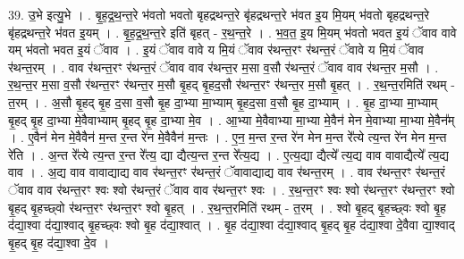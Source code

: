 \documentclass[17pt]{extarticle}
\begin{document}
39. उ॒भे इत्यु॒भे । . बृ॒ह॒द्र॒थ॒न्त॒रे भ॑वतो भवतो बृहद्रथन्त॒रे बृ॑हद्रथन्त॒रे भ॑वत इ॒य मि॒यम् भ॑वतो बृहद्रथन्त॒रे बृ॑हद्रथन्त॒रे भ॑वत इ॒यम् । . बृ॒ह॒द्र॒थ॒न्त॒रे इति॑ बृहत् - र॒थ॒न्त॒रे । . भ॒व॒त॒ इ॒य मि॒यम् भ॑वतो भवत इ॒यं ॅवाव वावे यम् भ॑वतो भवत इ॒यं ॅवाव । . इ॒यं ॅवाव वावे य मि॒यं ॅवाव र॑थन्त॒रꣳ र॑थन्त॒रं ॅवावे य मि॒यं ॅवाव र॑थन्त॒रम् । . वाव र॑थन्त॒रꣳ र॑थन्त॒रं ॅवाव वाव र॑थन्त॒र म॒सा व॒सौ र॑थन्त॒रं ॅवाव वाव र॑थन्त॒र म॒सौ । . र॒थ॒न्त॒र म॒सा व॒सौ र॑थन्त॒रꣳ र॑थन्त॒र म॒सौ बृ॒हद् बृ॒हद॒सौ र॑थन्त॒रꣳ र॑थन्त॒र म॒सौ बृ॒हत् । . र॒थ॒न्त॒रमिति॑ रथम् - त॒रम् । . अ॒सौ बृ॒हद् बृ॒ह द॒सा व॒सौ बृ॒ह दा॒भ्या मा॒भ्याम् बृ॒हद॒सा व॒सौ बृ॒ह दा॒भ्याम् । . बृ॒ह दा॒भ्या मा॒भ्याम् बृ॒हद् बृ॒ह दा॒भ्या मे॒वैवाभ्याम् बृ॒हद् बृ॒ह दा॒भ्या मे॒व । . आ॒भ्या मे॒वैवाभ्या मा॒भ्या मे॒वैन॑ मेन मे॒वाभ्या मा॒भ्या मे॒वैन᳚म् । . ए॒वैन॑ मेन मे॒वैवैन॑ म॒न्त र॒न्त रे॑न मे॒वैवैन॑ म॒न्तः । . ए॒न॒ म॒न्त र॒न्त रे॑न मेन म॒न्त रे᳚त्ये त्य॒न्त रे॑न मेन म॒न्त रे॑ति । . अ॒न्त रे᳚त्ये त्य॒न्त र॒न्त रे᳚त्य॒ द्या द्यैत्य॒न्त र॒न्त रे᳚त्य॒द्य । . ए॒त्य॒द्या द्यैत्ये᳚ त्य॒द्य वाव वावाद्यैत्ये᳚ त्य॒द्य वाव । . अ॒द्य वाव वावाद्याद्य वाव र॑थन्त॒रꣳ र॑थन्त॒रं ॅवावाद्याद्य वाव र॑थन्त॒रम् । . वाव र॑थन्त॒रꣳ र॑थन्त॒रं ॅवाव वाव र॑थन्त॒रꣳ श्वः श्वो र॑थन्त॒रं ॅवाव वाव र॑थन्त॒रꣳ श्वः । . र॒थ॒न्त॒रꣳ श्वः श्वो र॑थन्त॒रꣳ र॑थन्त॒रꣳ श्वो बृ॒हद् बृ॒हच्छ्वो र॑थन्त॒रꣳ र॑थन्त॒रꣳ श्वो बृ॒हत् । . र॒थ॒न्त॒रमिति॑ रथम् - त॒रम् । . श्वो बृ॒हद् बृ॒हच्छ्वः श्वो बृ॒ह द॑द्या॒श्वा द॑द्या॒श्वाद् बृ॒हच्छ्वः श्वो बृ॒ह द॑द्या॒श्वात् । . बृ॒ह द॑द्या॒श्वा द॑द्या॒श्वाद् बृ॒हद् बृ॒ह द॑द्या॒श्वा दे॒वैवा द्या॒श्वाद् बृ॒हद् बृ॒ह द॑द्या॒श्वा दे॒व । \newline
\end{document}
